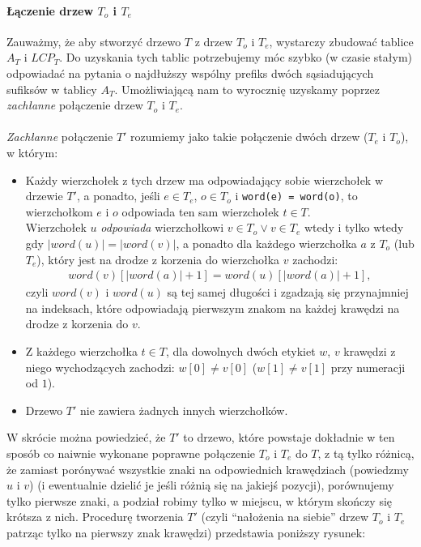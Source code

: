 \paragraph{Łączenie drzew $T_o$ i $T_e$}
Zauważmy, że aby stworzyć drzewo $T$ z drzew $T_o$ i $T_e$, wystarczy zbudować tablice $A_T$ i $LCP_T$. Do uzyskania tych tablic potrzebujemy móc szybko (w czasie stałym) odpowiadać na pytania o najdłuższy wspólny prefiks dwóch sąsiadujących sufiksów w tablicy $A_T$. Umożliwiającą nam to wyrocznię uzyskamy poprzez \textit{zachłanne} połączenie drzew $T_o$ i $T_e$. \\ \\
\textit{Zachłanne} połączenie $T'$ rozumiemy jako takie połączenie dwóch drzew ($T_e$ i $T_o$), w którym:
\begin{itemize}
 \item Każdy wierzchołek z tych drzew ma odpowiadający sobie wierzchołek w drzewie $T'$, a ponadto, jeśli $e \in T_e$, $o \in T_o$ i \verb|word(e) = word(o)|, to wierzchołkom $e$ i $o$ odpowiada ten sam wierzchołek $t \in T$. \\
 Wierzchołek $u$ \textit{odpowiada} wierzchołkowi $v \in T_o \vee v \in T_e$ wtedy i tylko wtedy gdy $|word(u)| = |word(v)|$, a ponadto dla każdego wierzchołka $a$ z $T_o$ (lub $T_e$), który jest na drodze z korzenia do wierzchołka $v$ zachodzi:
 \begin{align*}
     word(v)[|word(a)| + 1] = word(u)[|word(a)| + 1],
 \end{align*}
 czyli $word(v)$ i $word(u)$ są tej samej długości i zgadzają się przynajmniej na indeksach, które odpowiadają pierwszym znakom na każdej krawędzi na drodze z korzenia do $v$.
 \item Z każdego wierzchołka $t \in T$, dla dowolnych dwóch etykiet $w$, $v$ krawędzi z niego wychodzących zachodzi: $w[0] \ne v[0]$ ($w[1] \ne v[1]$ przy numeracji od $1$).
 \item Drzewo $T'$ nie zawiera żadnych innych wierzchołków.
\end{itemize}
W skrócie można powiedzieć, że $T'$ to drzewo, które powstaje dokładnie w ten sposób co naiwnie wykonane poprawne połączenie $T_o$ i $T_e$ do $T$, z tą tylko różnicą, że zamiast porónywać wszystkie znaki na odpowiednich krawędziach (powiedzmy $u$ i $v$) (i ewentualnie dzielić je jeśli różnią się na jakiejś pozycji), porównujemy tylko pierwsze znaki, a podział robimy tylko w miejscu, w którym skończy się krótsza z nich. Procedurę tworzenia $T'$ (czyli ``nałożenia na siebie'' drzew $T_o$ i $T_e$ patrząc tylko na pierwszy znak krawędzi) przedstawia poniższy rysunek:
